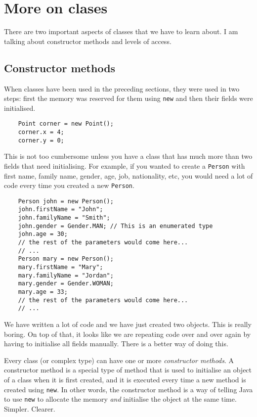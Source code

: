 
\section{More on clases}
\label{sec:more-clases}

There are two important aspects of classes that we have to learn
about. I am talking about constructor methods and levels of access. 

\subsection{Constructor methods}
\label{sec:constructor-methods}

When classes have been used in the preceding sections, they were used
in two steps: first the memory was reserved for them using \verb+new+
and then their fields were initialised. 

\begin{verbatim}
    Point corner = new Point();
    corner.x = 4;
    corner.y = 0;
\end{verbatim}

This is not too cumbersome unless you have a class that has much more
than two fields that need initialising. For example, if you wanted to
create a \verb+Person+ with first name, family name, gender, age, job,
nationality, etc, you would need a lot of code every time you created
a new \verb+Person+. 

\begin{verbatim}
    Person john = new Person();
    john.firstName = "John";
    john.familyName = "Smith";
    john.gender = Gender.MAN; // This is an enumerated type
    john.age = 30;
    // the rest of the parameters would come here...
    // ...
    Person mary = new Person();
    mary.firstName = "Mary";
    mary.familyName = "Jordan";
    mary.gender = Gender.WOMAN;
    mary.age = 33;
    // the rest of the parameters would come here...
    // ...
\end{verbatim}

We have written a lot of code and we have just created two
objects. This is really boring. On top of that, it looks like we are
repeating code over and over again by having to initialise all fields
manually. There is a better way of doing this. 

Every class (or complex type) can have one or more \emph{constructor
  methods}. A constructor method is a special type of method that is
used to initialise an object of a class when it is first created, and
it is executed every time a new method is created using \verb+new+. In
other words, the constructor method is a way of telling Java to use
\verb+new+ to allocate the memory \emph{and} initialise the object
at the same time. Simpler. Clearer. 

